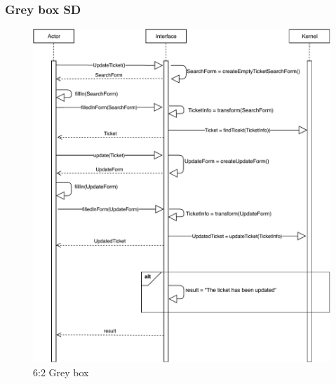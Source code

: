 \subsubsection{Grey box SD}
\creator{\studentA}
\updater{\studentB}
\begin{figure}[H]
    \centering
    \includegraphics[scale=0.8]{Iteration_3/Files/graybox_uc2.pdf}
    \caption{6:2 Grey box}
    \label{fig:6.2 Greybox}
\end{figure}

